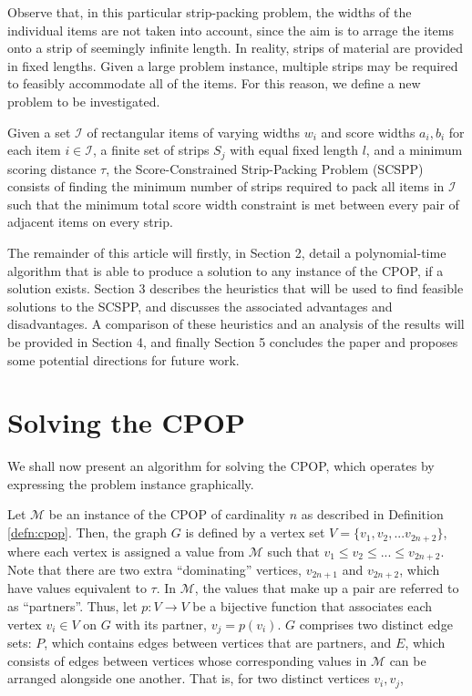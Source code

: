 \documentclass[oribibl]{llncs}
\begin{document}
Observe that, in this particular strip-packing problem, the widths of the individual items are not taken into account, since the aim is to arrage the items onto a strip of seemingly infinite length. In reality, strips of material are provided in fixed lengths. Given a large problem instance, multiple strips may be required to feasibly accommodate all of the items. For this reason, we define a new problem to be investigated.

\begin{definition}
	\label{defn:scspp}
	Given a set $\mathcal{I}$ of rectangular items of varying widths $w_i$ and score widths $a_i, b_i$ for each item $i \in \mathcal{I}$, a finite set of strips $S_j$ with equal fixed length $l$, and a minimum scoring distance $\tau$, the Score-Constrained Strip-Packing Problem (SCSPP) consists of finding the minimum number of strips required to pack all items in $\mathcal{I}$ such that the minimum total score width constraint is met between every pair of adjacent items on every strip.
\end{definition}

The remainder of this article will firstly, in Section 2, detail a polynomial-time algorithm that is able to produce a solution to any instance of the CPOP, if a solution exists. Section 3 describes the heuristics that will be used to find feasible solutions to the SCSPP, and discusses the associated advantages and disadvantages. A comparison of these heuristics and an analysis of the results will be provided in Section 4, and finally Section 5 concludes the paper and proposes some potential directions for future work.


\section{Solving the CPOP}
\label{sec:ahca}

We shall now present an algorithm for solving the CPOP, which operates by expressing the problem instance graphically. 

Let $\mathcal{M}$ be an instance of the CPOP of cardinality $n$ as described in Definition \ref{defn:cpop}. Then, the graph $G$ is defined by a vertex set $V = \{v_1, v_2, ...v_{2n+2}\}$, where each vertex is assigned a value from $\mathcal{M}$ such that $v_1 \leq v_2 \leq ... \leq v_{2n+2}$. Note that there are two extra ``dominating'' vertices, $v_{2n+1}$ and $v_{2n+2}$, which have values equivalent to $\tau$. In $\mathcal{M}$, the values that make up a pair are referred to as ``partners''. Thus, let $p: V \to V$ be a bijective function that associates each vertex $v_i \in V$ on $G$ with its partner, $v_j = p(v_i)$. $G$ comprises two distinct edge sets: $P$, which contains edges between vertices that are partners, and $E$, which consists of edges between vertices whose corresponding values in $\mathcal{M}$ can be arranged alongside one another. That is, for two distinct vertices $v_i, v_j$,
\end{document}
